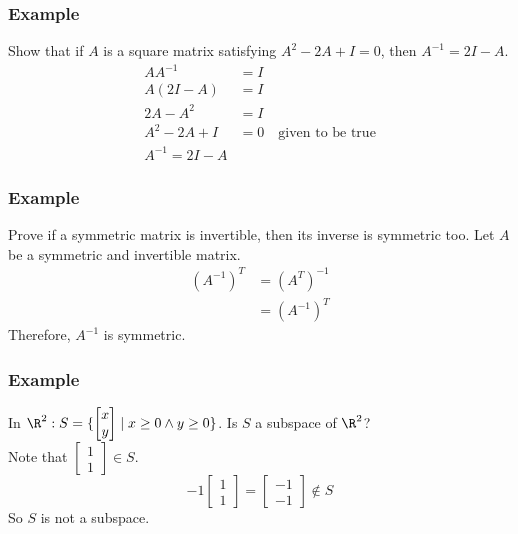 \documentclass[letterpaper, 12pt]{math}
\begin{document}
\subsubsection*{Example}
Show that if \( A \) is a square matrix satisfying \( A^2-2A+I = 0 \), then
\( A^{-1} = 2I - A \).
\begin{align*}
  AA^{-1} &= I \\
  A(2I-A) &= I \\
  2A-A^2 &= I \\
  A^2-2A+I &= 0 \quad \text{given to be true} \\
  A^{-1} = 2I-A
\end{align*}

\subsubsection*{Example}
Prove if a symmetric matrix is invertible, then its inverse is symmetric too.
Let \( A \) be a symmetric and invertible matrix.
\begin{align*}
  (A^{-1})^T &= (A^T)^{-1} \\
  &= (A^{-1})^T
\end{align*}
Therefore, \( A^{-1} \) is symmetric.

\subsubsection*{Example}
In \( \R^2: S = \{\begin{bmatrix}x \\ y\end{bmatrix}\mid x\ge0 \wedge y\ge0\}
\). Is \( S \) a subspace of \( \R^2 \)? \\
Note that \( \begin{bmatrix}1 \\ 1\end{bmatrix}\in S \).
\[ -1\begin{bmatrix}1 \\ 1\end{bmatrix} = \begin{bmatrix}-1 \\ -1\end{bmatrix}
  \notin S \]
So \( S \) is not a subspace.
\end{document}
